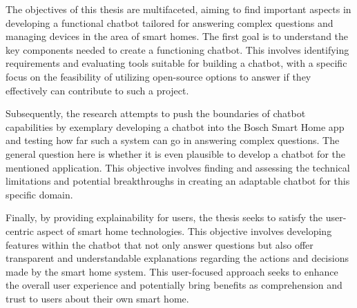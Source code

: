 

The objectives of this thesis are multifaceted, aiming to find important aspects in developing a functional chatbot tailored for answering complex questions and managing devices in the area of smart homes. The first goal is to understand the key components needed to create a functioning chatbot. This involves identifying requirements and evaluating tools suitable for building a chatbot, with a specific focus on the feasibility of utilizing open-source options to answer if they effectively can contribute to such a project.

Subsequently, the research attempts to push the boundaries of chatbot capabilities by exemplary developing a chatbot into the Bosch Smart Home app and testing how far such a system can go in answering complex questions. The general question here is whether it is even plausible to develop a chatbot for the mentioned application. This objective involves finding and assessing the technical limitations and potential breakthroughs in creating an adaptable chatbot for this specific domain.

Finally, by providing explainability for users, the thesis seeks to satisfy the user-centric aspect of smart home technologies. This objective involves developing features within the chatbot that not only answer questions but also offer transparent and understandable explanations regarding the actions and decisions made by the smart home system. This user-focused approach seeks to enhance the overall user experience and potentially bring benefits as comprehension and trust to users about their own smart home. 

